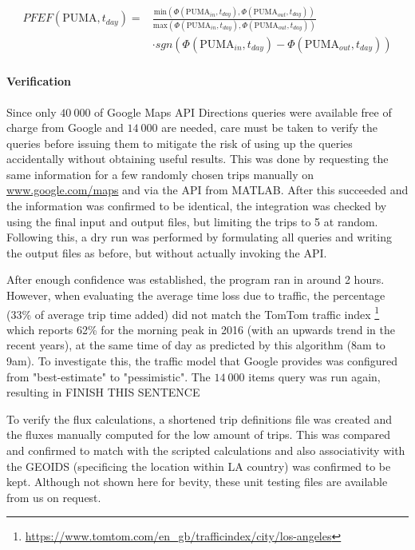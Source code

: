 \begin{align} \label{eq:PFEF}
    \begin{split}
        PFEF(\text{PUMA}, t_{day}) = &\frac{\text{min} 
        \left(
            \Phi(\text{PUMA}_{in}, t_{day}),
            \Phi(\text{PUMA}_{out}, t_{day})
        \right)
        }{\text{max} 
        \left(
            \Phi(\text{PUMA}_{in}, t_{day}),
            \Phi(\text{PUMA}_{out}, t_{day})
        \right)
        } \\
        &\cdot sgn ( \Phi(\text{PUMA}_{in}, t_{day}) - \Phi(\text{PUMA}_{out}, t_{day}) )
    \end{split}
\end{align}



\paragraph{Verification}

Since only $40\ 000$ of Google Maps API Directions queries were available free of charge from Google and $14\ 000$ are needed, care must be taken to verify the queries before issuing them to mitigate the risk of using up the queries accidentally without obtaining useful results. This was done by requesting the same information for a few randomly chosen trips manually on \url{www.google.com/maps} and via the API from MATLAB. After this succeeded and the information was confirmed to be identical, the integration was checked by using the final input and output files, but limiting the trips to 5 at random. Following this, a dry run was performed by formulating all queries and writing the output files as before, but without actually invoking the API. 

After enough confidence was established, the program ran in around 2 hours. However, when evaluating the average time loss due to traffic, the percentage (33\% of average trip time added) did not match the TomTom traffic index \footnote{\url{https://www.tomtom.com/en_gb/trafficindex/city/los-angeles}} which reports 62\% for the morning peak in 2016 (with an upwards trend in the recent years), at the same time of day as predicted by this algorithm (8am to 9am). To investigate this, the traffic model that Google provides was configured from "best-estimate" to "pessimistic". The $14\ 000$ items query was run again, resulting in FINISH THIS SENTENCE

To verify the flux calculations, a shortened trip definitions file was created and the fluxes manually computed for the low amount of trips. This was compared and confirmed to match with the scripted calculations and also associativity with the GEOIDS (specificing the location within LA country) was confirmed to be kept. Although not shown here for bevity, these unit testing files are available from us on request.



